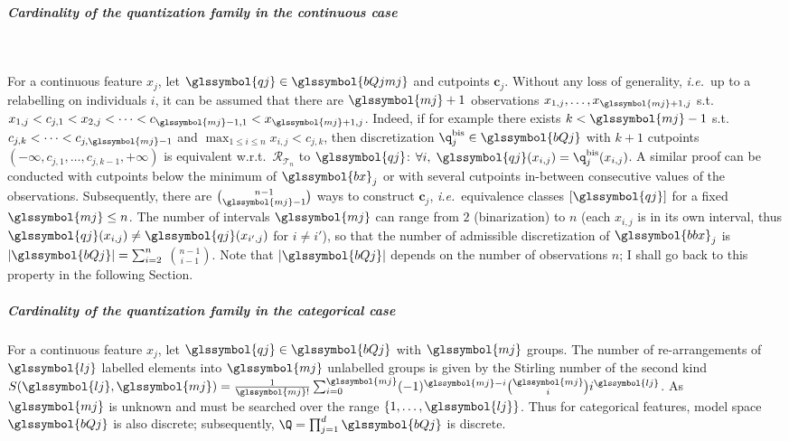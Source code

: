 \subparagraph{Cardinality of the quantization family in the continuous case} ~\label{par:cardinality}

For a continuous feature $x_j$, let $\glssymbol{qj} \in \glssymbol{bQjmj}$ and cutpoints $\boldsymbol{c}_j$. Without any loss of generality, \textit{i.e.}\ up to a relabelling on individuals $i$, it can be assumed that there are $\glssymbol{mj}+1$ observations $x_{1,j},\dots,x_{\glssymbol{mj}+1,j}$ s.t.\ $x_{1,j} < c_{j,1} < x_{2,j} < \dots < c_{\glssymbol{mj}-1,1} < x_{\glssymbol{mj}+1,j}$. Indeed, if for example there exists $k < \glssymbol{mj} - 1$ s.t.\ $c_{j,k} < \dots < c_{j,\glssymbol{mj}-1}$ and $\max_{1 \leq i \leq n} x_{i,j} < c_{j,k}$, then discretization $\q^{\text{bis}}_j \in \glssymbol{bQj}$ with $k+1$ cutpoints $(-\infty,c_{j,1},\dots,c_{j,k-1},+\infty)$ is equivalent w.r.t.\ $\mathcal{R}_{\mathcal{T}_n}$ to $\glssymbol{qj}$: $\forall i, \; \glssymbol{qj}(x_{i,j}) = \q^{\text{bis}}_j(x_{i,j})$. A similar proof can be conducted with cutpoints below the minimum of $\glssymbol{bx}_j$ or with several cutpoints in-between consecutive values of the observations. Subsequently, there are $\binom{n-1}{\glssymbol{mj}-1}$ ways to construct $\bm{c}_j$, \textit{i.e.}\ equivalence classes $[\glssymbol{qj}]$ for a fixed $\glssymbol{mj} \leq n$. The number of intervals $\glssymbol{mj}$ can range from $2$ (binarization) to $n$ (each $x_{i,j}$ is in its own interval, thus $\glssymbol{qj}(x_{i,j}) \neq \glssymbol{qj}(x_{i',j})$ for $i \neq i'$), so that the number of admissible discretization of $\glssymbol{bbx}_j$ is $|\glssymbol{bQj}| = \sum_{i=2}^{n}$ ${n-1}\choose{i-1}$. Note that $|\glssymbol{bQj}|$ depends on the number of observations $n$; I shall go back to this property in the following Section.


\subparagraph{Cardinality of the quantization family in the categorical case}

For a continuous feature $x_j$, let $\glssymbol{qj} \in \glssymbol{bQj}$ with $\glssymbol{mj}$ groups. The number of re-arrangements of $\glssymbol{lj}$ labelled elements into $\glssymbol{mj}$ unlabelled groups is given by the Stirling number of the second kind $S(\glssymbol{lj},\glssymbol{mj}) = \frac{1}{\glssymbol{mj}!} \sum_{i=0}^{\glssymbol{mj}} (-1)^{\glssymbol{mj}-i} {\glssymbol{mj} \choose i} i^{\glssymbol{lj}}$. As $\glssymbol{mj}$ is unknown and must be searched over the range $\{1,\dots,\glssymbol{lj}\}$. Thus for categorical features, model space $\glssymbol{bQj}$ is also discrete; subsequently, $\Q = \prod_{j=1}^d \glssymbol{bQj}$ is discrete.







